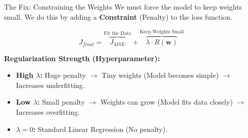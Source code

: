 \begin{frame}{The Fix: Constraining the Weights}
    We must force the model to keep weights small. We do this by adding a \textbf{Constraint} (Penalty) to the loss function.
    
    \centering

    \vspace{-2em}
    \large
    $$ J_{final} = \overbrace{J_{MSE}}^{\text{Fit the Data}} + \overbrace{\lambda \cdot R(\mathbf{w})}^{\text{Keep Weights Small}} $$
    \normalsize
    
    \begin{tcolorbox}[colback=yellow!10, colframe=orange!60, scale=0.75, title=\textbf{What is $\lambda$ (Lambda)?}]
        \textbf{Regularization Strength (Hyperparameter):}
        \begin{itemize}
            \item \textbf{High $\lambda$:} Huge penalty $\to$ Tiny weights (Model becomes simple) $\to$ Increases underfitting.
            \item \textbf{Low $\lambda$:} Small penalty $\to$ Weights can grow (Model fits data closely) $\to$ Increases overfitting.
            \item \textbf{$\lambda = 0$:} Standard Linear Regression (No penalty).
        \end{itemize}
    \end{tcolorbox}
\end{frame}


